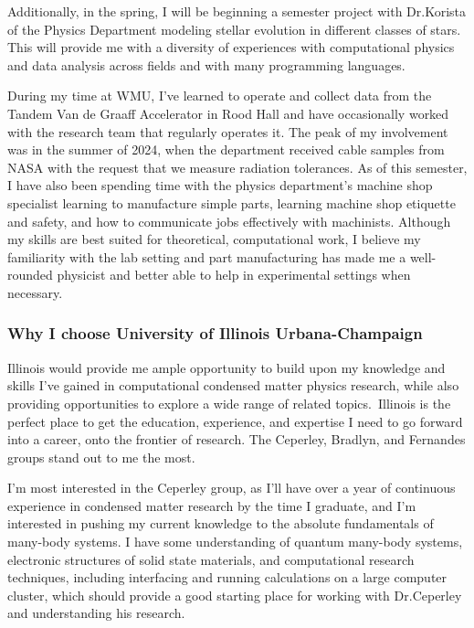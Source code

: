 \documentclass[11pt]{article}
\newcommand{\school}{University of Illinois Urbana-Champaign}
\newcommand{\schoolabbr}{Illinois}
\begin{document}
Additionally, in the spring, I will be beginning a semester project with Dr.\@ Korista of the Physics Department modeling stellar evolution in different classes of stars. This will provide me with a diversity of experiences with computational physics and data analysis across fields and with many programming languages.

During my time at WMU, I've learned to operate and collect data from the Tandem Van de Graaff Accelerator in Rood Hall and have occasionally worked with the research team that regularly operates it. The peak of my involvement was in the summer of 2024, when the department received cable samples from NASA with the request that we measure radiation tolerances. As of this semester, I have also been spending time with the physics department's machine shop specialist learning to manufacture simple parts, learning machine shop etiquette and safety, and how to communicate jobs effectively with machinists. Although my skills are best suited for theoretical, computational work, I believe my familiarity with the lab setting and part manufacturing has made me a well-rounded physicist and better able to help in experimental settings when necessary.
\pagebreak

\phantom{}
\vspace{-5em}
\subsubsection*{Why I choose \school{}}
\schoolabbr{} would provide me ample opportunity to build upon my knowledge and skills I've gained in computational condensed matter physics research, while also providing opportunities to explore a wide range of related topics.\ \schoolabbr{} is the perfect place to get the education, experience, and expertise I need to go forward into a career, onto the frontier of research. The Ceperley, Bradlyn, and Fernandes groups stand out to me the most.

I'm most interested in the Ceperley group, as I'll have over a year of continuous experience in condensed matter research by the time I graduate, and I'm interested in pushing my current knowledge to the absolute fundamentals of many-body systems. I have some understanding of quantum many-body systems, electronic structures of solid state materials, and computational research techniques, including interfacing and running calculations on a large computer cluster, which should provide a good starting place for working with Dr.\@ Ceperley and understanding his research.
\end{document}
